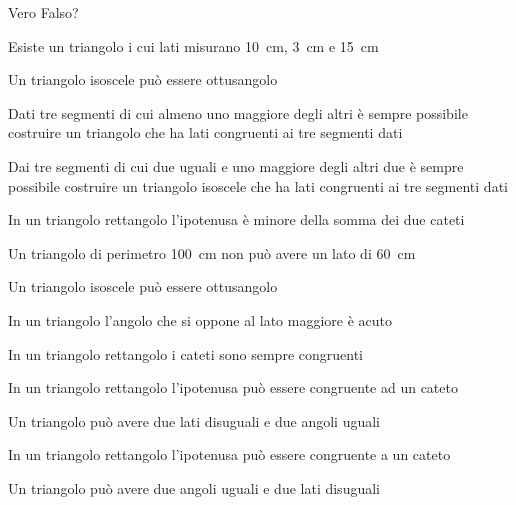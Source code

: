\begin{esercizio}
\label{ese:3.79}
Vero Falso? 
\begin{enumeratea}
\item Esiste un triangolo i cui lati misurano 10~cm, 3~cm e 15~cm\hfill\boxV\quad\boxF
\item Un triangolo isoscele può essere ottusangolo\hfill\boxV\quad\boxF
\item Dati tre segmenti di cui almeno uno maggiore degli altri è sempre possibile costruire un triangolo che ha lati congruenti ai tre segmenti dati\hfill\boxV\quad\boxF
\item Dai tre segmenti di cui due uguali e uno maggiore degli altri due è sempre possibile costruire un triangolo isoscele che ha lati congruenti ai tre segmenti dati\hfill\boxV\quad\boxF
\item In un triangolo rettangolo l'ipotenusa è minore della somma dei due cateti\hfill\boxV\quad\boxF
\item Un triangolo di perimetro 100~cm non può avere un lato di 60~cm\hfill\boxV\quad\boxF
\item Un triangolo isoscele può essere ottusangolo\hfill\boxV\quad\boxF
\item In un triangolo l'angolo che si oppone al lato maggiore è acuto\hfill\boxV\quad\boxF
\item In un triangolo rettangolo i cateti sono sempre congruenti\hfill\boxV\quad\boxF
\item In un triangolo rettangolo l'ipotenusa può essere congruente ad un cateto\hfill\boxV\quad\boxF
\item Un triangolo può avere due lati disuguali e due angoli uguali\hfill\boxV\quad\boxF
\item In un triangolo rettangolo l'ipotenusa può essere congruente a un cateto\hfill\boxV\quad\boxF
\item Un triangolo può avere due angoli uguali e due lati disuguali\hfill\boxV\quad\boxF
\end{enumeratea}
\end{esercizio}

